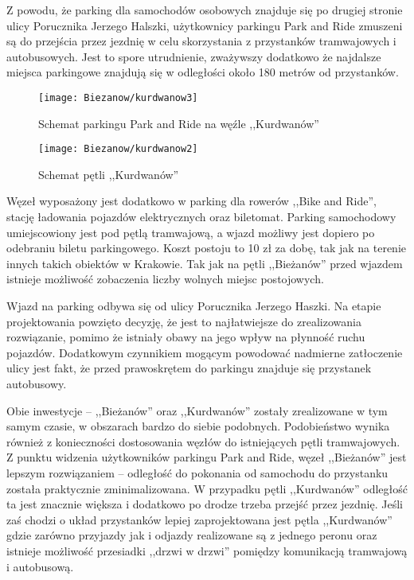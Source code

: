 \documentclass[twoside,12pt]{article}
\begin{document}
	Z powodu, że parking dla samochodów osobowych znajduje się po drugiej stronie ulicy Porucznika Jerzego Halszki, użytkownicy parkingu Park and Ride zmuszeni są do przejścia przez jezdnię w celu skorzystania z przystanków tramwajowych i autobusowych. Jest to spore utrudnienie, zważywszy dodatkowo że najdalsze miejsca parkingowe znajdują się w odległości około 180 metrów od przystanków. 
	
	\begin{figure}[H]
		\centering
		\texttt{[image: Biezanow/kurdwanow3]}\\
		\caption{Schemat parkingu Park and Ride na węźle ,,Kurdwanów''}
		\label{kurdwanow3}
	\end{figure}		
	
	\begin{figure}[H]
		\centering
		\texttt{[image: Biezanow/kurdwanow2]}\\
		\caption{Schemat pętli ,,Kurdwanów''}
		\label{kurdwanow2}
	\end{figure}	
	
	Węzeł wyposażony jest dodatkowo w parking dla rowerów ,,Bike and Ride'', stację ładowania pojazdów elektrycznych oraz biletomat. Parking samochodowy umiejscowiony jest pod pętlą tramwajową, a wjazd możliwy jest dopiero po odebraniu biletu parkingowego. Koszt postoju to 10 zł za dobę, tak jak na terenie innych takich obiektów w Krakowie. Tak jak na pętli ,,Bieżanów'' przed wjazdem istnieje możliwość zobaczenia liczby wolnych miejsc postojowych. 
	
	Wjazd na parking odbywa się od ulicy Porucznika Jerzego Haszki. Na etapie projektowania powzięto decyzję, że jest to najłatwiejsze do zrealizowania rozwiązanie, pomimo że istniały obawy na jego wpływ na płynność ruchu pojazdów. Dodatkowym czynnikiem mogącym powodować nadmierne zatłoczenie ulicy jest fakt, że przed prawoskrętem do parkingu znajduje się przystanek autobusowy.
	
	Obie inwestycje -- ,,Bieżanów'' oraz ,,Kurdwanów'' zostały zrealizowane w tym samym czasie, w obszarach bardzo do siebie podobnych. Podobieństwo wynika również z konieczności dostosowania węzłów do istniejących pętli tramwajowych. Z punktu widzenia użytkowników parkingu Park and Ride, węzeł ,,Bieżanów'' jest lepszym rozwiązaniem -- odległość do pokonania od samochodu do przystanku została praktycznie zminimalizowana. W przypadku pętli ,,Kurdwanów'' odległość ta jest znacznie większa i dodatkowo po drodze trzeba przejść przez jezdnię. Jeśli zaś chodzi o układ przystanków lepiej zaprojektowana jest pętla ,,Kurdwanów'' gdzie zarówno przyjazdy jak i odjazdy realizowane są z jednego peronu oraz istnieje możliwość przesiadki ,,drzwi w drzwi'' pomiędzy komunikacją tramwajową i autobusową.
	
\end{document}
